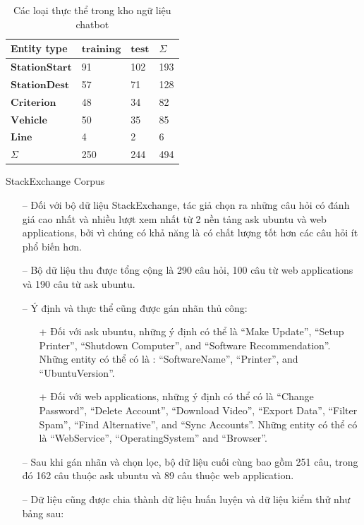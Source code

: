 \begin{table}[]
\begin{center}
\begin{tabular}{|l|l|l|l|}
\hline
Entity type           & $\textbf{training}$ & $\textbf{test}$ & $\Sigma$   \\ \hline
$\textbf{StationStart}$ & 91                & 102           & 193 \\ \hline
$\textbf{StationDest}$  & 57                & 71            & 128 \\ \hline
$\textbf{Criterion}$    & 48                & 34            & 82  \\ \hline
$\textbf{Vehicle}$      & 50                & 35            & 85  \\ \hline
$\textbf{Line}$         & 4                 & 2             & 6   \\ \hline
$\Sigma$                    & 250               & 244           & 494 \\ \hline

\end{tabular}
\caption{Các loại thực thể trong kho ngữ liệu chatbot}
\label{fig:comparisonimg-1}
\end{center}
\end{table}


StackExchange Corpus

\begin{itemize}
    \item[--] Đối với bộ dữ liệu StackExchange, tác giả chọn ra những câu hỏi có đánh giá cao nhất và nhiều lượt xem nhất từ 2 nền tảng ask ubuntu và web applications,  bởi vì chúng có khả năng là có chất lượng tốt hơn các câu hỏi ít phổ biến hơn.
        \item[--]Bộ dữ liệu thu được tổng cộng là 290 câu hỏi, 100 câu từ web applications và 190 câu từ ask ubuntu.
        \item[--]Ý định và thực thể cũng được gán nhãn thủ công:
        \begin{itemize}
            \item[+]Đối với ask ubuntu, những ý định có thể là “Make Update”, “Setup Printer”, “Shutdown Computer”, and “Software Recommendation”. Những entity có thể có là : “SoftwareName”, “Printer”, and “UbuntuVersion”.
            \item[+] Đối với web applications, những ý định có thể có là “Change Password”, “Delete Account”, “Download Video”, “Export Data”, “Filter Spam”, “Find Alternative”, and “Sync Accounts”. Những entity có thể có là “WebService”, “OperatingSystem” and “Browser”.
        \end{itemize}
    \item[--] Sau khi gán nhãn và chọn lọc, bộ dữ liệu cuối cùng bao gồm 251 câu, trong đó 162 câu thuộc ask ubuntu và 89 câu thuộc web application.
    \item[--] Dữ liệu cũng được chia thành dữ liệu huấn luyện và dữ liệu kiểm thử như bảng sau:
\end{itemize}


